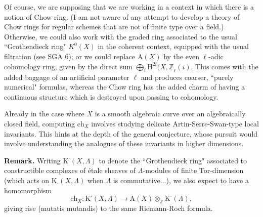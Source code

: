 Of course, we are supposing that we are working in a context in which there is a notion of Chow ring. (I am not aware of any attempt to develop a theory of Chow rings for regular schemes that are not of finite type over a field.) Otherwise, we could also work with the graded ring associated to the usual ``Grothendieck ring" $K^0(X)$ in the coherent context, equipped with the usual filtration (see SGA 6); or we could replace $\text{A}(X)$ by the even $\ell$-adic cohomology ring, given by the direct sum $\bigoplus_i \text{H}^{2i}(X, \underline{\mathbb{Z}}_\ell(i)$. This comes with the added baggage of an artificial parameter $\ell$ and produces coarser, ``purely numerical" formulas, whereas the Chow ring has the added charm of having a continuous structure which is destroyed upon passing to cohomology.

Already in the case where $X$ is a smooth algebraic curve over an algebraically closed field, computing $\text{ch}_X$ involves studying delicate Artin-Serre-Swan-type local invariants. This hints at the depth of the general conjecture, whose pursuit would involve understanding the analogues of these invariants in higher dimensions. 

\textbf{Remark.}  Writing $\text{K}^{\cdot}(X, \Lambda)$ to denote the ``Grothendieck ring" associated to constructible complexes of \'etale sheaves of $\Lambda$-modules of finite Tor-dimension (which acts on $\text{K}_{\cdot}(X, \Lambda)$ when $\Lambda$ is commutative...), we also expect to have a homomorphism
\begin{equation}\label{chern1.2} 
\text{ch}_X: \text{K}^{\cdot}(X, \Lambda) \to \text{A}(X) \otimes_{\mathbb{Z}} \text{K}^\cdot(\Lambda), 
\end{equation}
giving rise (mutatis mutandis) to the same Riemann-Roch formula.

